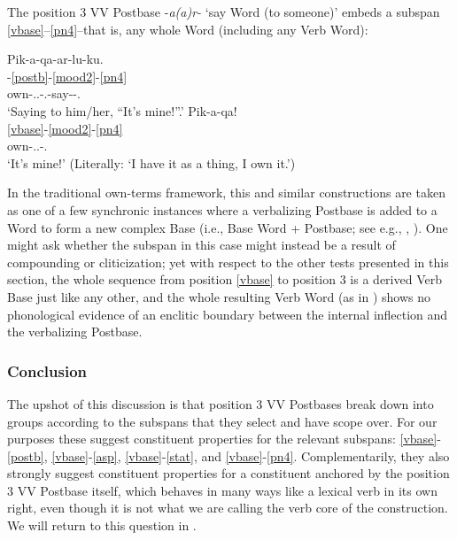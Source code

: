 \documentclass[output=paper]{langscibook}
\begin{document}
The position 3 VV Postbase -\textit{a(a)r-} `say Word (to someone)' embeds a subspan \ref{vbase}--\ref{pn4}--that is, any whole Word (including any Verb Word):

\ea\label{ex:key:38}
\ea\label{ex:key:38a}\glll Pik-a-qa-ar-lu-ku.\\
    [\ref{vbase}-\ref{mood2}-\ref{pn4}-]-\ref{postb}-\ref{mood2}-\ref{pn4}\\
     own-\Ind{}.\Tsg.\Obj{}-\Fsg.\Aarg{}-say-\Appos-\Third\Sarg.\Obj{}\\
\glt `Saying to him/her, ``It's mine!''.'
\ex\label{ex:key:38b}
\glll Pik-a-qa!\\
    \ref{vbase}-\ref{mood2}-\ref{pn4} \\
     own-\Ind{}.\Tsg.\Obj{}-\Fsg.\Aarg{}\\
\glt `It's mine!' (Literally: `I have it as a thing, I own it.')
\z
\z

In the traditional own-terms framework, this and similar constructions are taken as one of a few synchronic instances where a verbalizing Postbase is added to a Word to form a new complex Base (i.e., Base \rightarrow Word + Postbase; see e.g., \citealt{Reuse1994}, \citealt{Sadock2017}). One might ask whether the subspan in this case might instead be a result of compounding or cliticization; yet with respect to the other tests presented in this section, the whole sequence from position \ref{vbase} to position 3 is a derived Verb Base just like any other, and the whole resulting Verb Word (as in ) shows no phonological evidence of an enclitic boundary between the internal inflection and the verbalizing Postbase.

\subsubsection{Conclusion} 
\label{sec:5.6.5}

The upshot of this discussion is that position 3 VV Postbases break down into groups according to the subspans that they select and have scope over. For our purposes these suggest constituent properties for the relevant subspans: \ref{vbase}-\ref{postb}, \ref{vbase}-\ref{asp}, \ref{vbase}-\ref{stat}, and \ref{vbase}-\ref{pn4}. Complementarily, they also strongly suggest constituent properties for a constituent anchored by the position 3 VV Postbase itself, which behaves in many ways like a lexical verb in its own right, even though it is not what we are calling the verb core of the construction. We will return to this question in .
\end{document}
